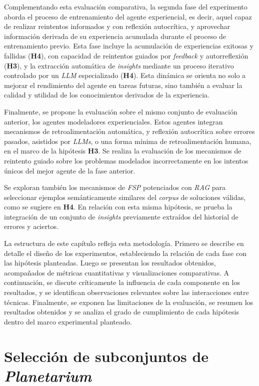 Complementando esta evaluación comparativa, la segunda fase del experimento aborda el proceso de entrenamiento del agente experiencial, es decir, aquel capaz de realizar reintentos informados y con reflexión autocrítica, y aprovechar información derivada de su experiencia acumulada durante el proceso de entrenamiento previo. Esta fase incluye la acumulación de experiencias exitosas y fallidas (\textbf{H4}), con capacidad de reintentos guiados por \textit{feedback} y autorreflexión (\textbf{H3}), y la extracción automática de \textit{insights} mediante un proceso iterativo controlado por un \textit{LLM} especializado (\textbf{H4}). Esta dinámica se orienta no solo a mejorar el rendimiento del agente en tareas futuras, sino también a evaluar la calidad y utilidad de los conocimientos derivados de la experiencia.

Finalmente, se propone la evaluación sobre el mismo conjunto de evaluación anterior, los agentes modeladores experienciales. Estos agentes integran mecanismos de retroalimentación automática, y reflexión autocrítica sobre errores pasados, asistidos por \textit{LLMs}, o una forma mínima de retroalimentación humana, en el marco de la hipótesis \textbf{H3}. Se realiza la evaluación de los mecanismos de reintento guiado sobre los problemas modelados incorrectamente en los intentos únicos del mejor agente de la fase anterior.

Se exploran también los mecanismos de \textit{FSP} potenciados con \textit{RAG} para seleccionar ejemplos semánticamente similares del \textit{corpus} de soluciones válidas, como se sugiere en \textbf{H4}. En relación con esta misma hipótesis, se prueba la integración de un conjunto de \textit{insights} previamente extraídos del historial de errores y aciertos.

La estructura de este capítulo refleja esta metodología. Primero se describe en detalle el diseño de los experimentos, estableciendo la relación de cada fase con las hipótesis planteadas. Luego se presentan los resultados obtenidos, acompañados de métricas cuantitativas y visualizaciones comparativas. A continuación, se discute críticamente la influencia de cada componente en los resultados, y se identifican observaciones relevantes sobre las interacciones entre técnicas. Finalmente, se exponen las limitaciones de la evaluación, se resumen los resultados obtenidos y se analiza el grado de cumplimiento de cada hipótesis dentro del marco experimental planteado.

\section{Selección de subconjuntos de \textit{Planetarium}}

